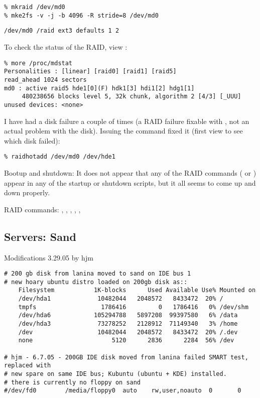 \documentclass[12pt,twoside]{article}
\begin{document}
\begin{verbatim}
% mkraid /dev/md0
% mke2fs -v -j -b 4096 -R stride=8 /dev/md0
\end{verbatim}

\begin{verbatim}
/dev/md0 /raid ext3 defaults 1 2
\end{verbatim}

To check the status of the RAID, view :
\begin{verbatim}
% more /proc/mdstat
Personalities : [linear] [raid0] [raid1] [raid5]
read_ahead 1024 sectors
md0 : active raid5 hde1[0](F) hdk1[3] hdi1[2] hdg1[1]
     480238656 blocks level 5, 32k chunk, algorithm 2 [4/3] [_UUU]
unused devices: <none>
\end{verbatim}

I have had a disk failure a couple of times (a RAID failure fixable
with , not an actual problem with the disk).
Issuing the  command fixed it (first view
 to see which disk failed):
\begin{verbatim}
% raidhotadd /dev/md0 /dev/hde1
\end{verbatim}

Bootup and shutdown: It does not appear that any of the RAID commands 
( or ) appear in any of the startup
or shutdown scripts, but it all seems to come up and down properly.

RAID commands:
, , ,
, ,  

\subsection{Servers: Sand}\label{sxn:sand.ess.uci.edu}
Modifications 3.29.05 by hjm
\begin{verbatim}
# 200 gb disk from lanina moved to sand on IDE bus 1
# new hoary ubuntu distro loaded on 200gb disk as::
    Filesystem           1K-blocks      Used Available Use% Mounted on
    /dev/hda1             10482044   2048572   8433472  20% /
    tmpfs                  1786416         0   1786416   0% /dev/shm
    /dev/hda6            105294788   5897208  99397580   6% /data
    /dev/hda3             73278252   2128912  71149340   3% /home
    /dev                  10482044   2048572   8433472  20% /.dev
    none                      5120      2836      2284  56% /dev

# hjm - 6.7.05 - 200GB IDE disk moved from lanina failed SMART test, replaced with 
# new spare on same IDE bus; Kubuntu (ubuntu + KDE) installed.
# there is currently no floppy on sand
#/dev/fd0        /media/floppy0  auto    rw,user,noauto  0       0
\end{verbatim}
\end{document}
